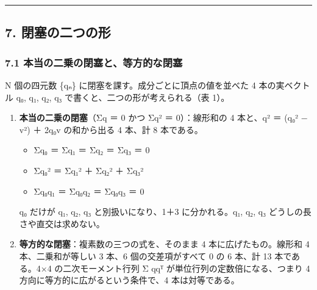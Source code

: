 \documentclass[
  a4paper,
]{ltjsarticle}
\providecommand{\tightlist}{%
  \setlength{\itemsep}{0pt}\setlength{\parskip}{0pt}}
\begin{document}
\begin{center}\rule{0.5\linewidth}{0.5pt}\end{center}

\subsection{7.
閉塞の二つの形}\label{ux9589ux585eux306eux4e8cux3064ux306eux5f62}

\subsubsection{7.1
本当の二乗の閉塞と、等方的な閉塞}\label{ux672cux5f53ux306eux4e8cux4e57ux306eux9589ux585eux3068ux7b49ux65b9ux7684ux306aux9589ux585e}

N 個の四元数 \{qₙ\} に閉塞を課す。成分ごとに頂点の値を並べた 4
本の実ベクトル q₀, q₁, q₂, q₃ で書くと、二つの形が考えられる（表 1）。

\begin{enumerate}
\def\labelenumi{\arabic{enumi}.}
\tightlist
\item
  \textbf{本当の二乗の閉塞}（Σq ＝ 0 かつ Σq² ＝ 0）：線形和の 4
  本と、q² ＝ (q₀² − \textbar v\textbar²) ＋ 2q₀v の和から出る 4 本、計
  8 本である。

  \begin{itemize}
  \tightlist
  \item
    Σq₀ ＝ Σq₁ ＝ Σq₂ ＝ Σq₃ ＝ 0
  \item
    Σq₀² ＝ Σq₁² ＋ Σq₂² ＋ Σq₃²
  \item
    Σq₀q₁ ＝ Σq₀q₂ ＝ Σq₀q₃ ＝ 0
  \end{itemize}

  q₀ だけが q₁, q₂, q₃ と別扱いになり、1＋3 に分かれる。q₁, q₂, q₃
  どうしの長さや直交は求めない。
\item
  \textbf{等方的な閉塞}：複素数の三つの式を、そのまま 4
  本に広げたもの。線形和 4 本、二乗和が等しい 3 本、6 個の交差項がすべて
  0 の 6 本、計 13 本である。4×4 の二次モーメント行列 Σ qqᵀ
  が単位行列の定数倍になる、つまり 4 方向に等方的に広がるという条件で、4
  本は対等である。
\end{enumerate}
\end{document}
